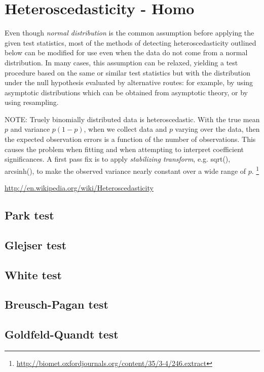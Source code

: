 \chapter{Heteroscedasticity - Homo}
\label{chap:heteroscedasticity}

Even though {\it normal distribution} is the common assumption before applying
the given test statistics, most of the methods of detecting heteroscedasticity
outlined below can be modified for use even when the data do not come from a
normal distribution. In many cases, this assumption can be relaxed, yielding a
test procedure based on the same or similar test statistics but with the
distribution under the null hypothesis evaluated by alternative routes: for
example, by using asymptotic distributions which can be obtained from asymptotic
theory, or by using resampling.

NOTE: Truely binomially distributed data is heteroscedastic. With the true mean
$p$ and variance $p(1-p)$, when we collect data and $p$ varying over the data,
then the expected observation errors is a function of the number of
observations. This causes the problem when  fitting and when attempting to
interpret coefficient significances. A first pass fix is to apply {\it
stabilizing transform}, e.g. sqrt(), arcsinh(), to make the observed variance
nearly constant over a wide range of $p$.
\footnote{\url{http://biomet.oxfordjournals.org/content/35/3-4/246.extract}}



\url{http://en.wikipedia.org/wiki/Heteroscedasticity}


\section{Park test}


\section{Glejser test}


\section{White test}


\section{Breusch-Pagan test}


\section{Goldfeld-Quandt test}

